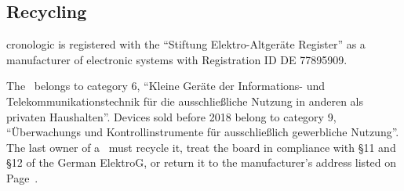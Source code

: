 \subsection{Recycling}
cronologic is registered with the ``Stiftung Elektro-Altger\"a{}te Register''
as a manufacturer of electronic systems with Registration ID DE 77895909.\par
The \deviceName\ belongs to category 6, ``Kleine Geräte der Informations- und
Telekommunikationstechnik für die ausschließliche Nutzung in anderen als
privaten Haushalten''.  Devices sold before 2018 belong to category 9,
``\"U{}berwachungs und Kontrollinstrumente f\"u{}r aus\-schlie\ss lich
gewerbliche Nutzung''. The last owner of a \deviceName\ must recycle it,
treat the board in compliance with \S{}11 and \S{}12 of the German ElektroG,
or return it to the manufacturer's address listed on Page~\pageref{cp:manu}.